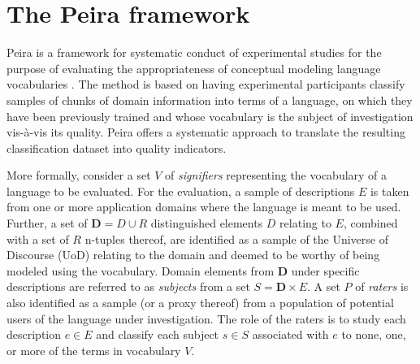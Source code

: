 
\section{The Peira framework}\label{sec:background}

Peira is a framework for systematic conduct of experimental studies for the purpose of evaluating the appropriateness of conceptual modeling language vocabularies \cite{LZMK.24}. The method is based on having experimental participants classify samples of chunks of domain information into terms of a language, on which they have been previously trained and whose vocabulary is the subject of investigation vis-\`{a}-vis its quality. Peira offers a systematic approach to translate the resulting classification dataset into quality indicators.

More formally, consider a set $V$ of \textit{signifiers} representing the vocabulary of a language to be evaluated. For the evaluation, a sample of descriptions $E$ is taken from one or more application domains where the language is meant to be used. Further, a set of $\mathbf{D} = D \cup R$ distinguished elements $D$ relating to $E$, combined with a set of $R$ n-tuples thereof, are identified as a sample of the Universe of Discourse (UoD) relating to the domain and deemed to be worthy of being modeled using the vocabulary. Domain elements from $\mathbf{D}$ under specific descriptions are referred to as \textit{subjects} from a set $S = \mathbf{D} \times E$. A set $P$ of \textit{raters} is also identified as a sample (or a proxy thereof) from a population of potential users of the language under investigation. The role of the raters is to study each description  $e\in E$ and classify each subject $s\in S$ associated with $e$ to none, one, or more of the terms in vocabulary $V$.

